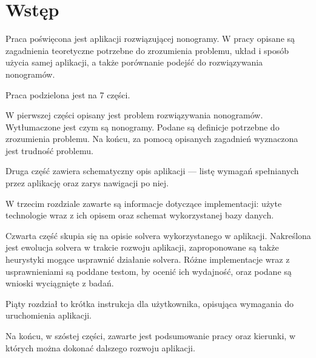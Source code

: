 \chapter*{Wstęp}

\thispagestyle{chapterBeginStyle}



	Praca poświęcona jest aplikacji rozwiązującej nonogramy. W pracy opisane są zagadnienia
teoretyczne potrzebne do zrozumienia problemu, układ i sposób użycia samej aplikacji, a także
porównanie podejść do rozwiązywania nonogramów.

	Praca podzielona jest na 7 części.

	W pierwszej części opisany jest problem rozwiązywania nonogramów. Wytłumaczone jest
czym są nonogramy. Podane są definicje potrzebne do zrozumienia problemu. Na końcu, za pomocą
opisanych zagadnień wyznaczona jest trudność problemu.

	Druga część zawiera schematyczny opis aplikacji — listę wymagań spełnianych przez
aplikację oraz zarys nawigacji po niej.

	W trzecim rozdziale zawarte są informacje dotyczące implementacji: użyte technologie wraz
z ich opisem oraz schemat wykorzystanej bazy danych.

	Czwarta część skupia się na opisie solvera wykorzystanego w aplikacji. Nakreślona jest ewolucja
solvera w trakcie rozwoju aplikacji, zaproponowane są także heurystyki mogące usprawnić działanie
solvera. Różne implementacje wraz z usprawnieniami są poddane testom, by ocenić ich wydajność,
oraz podane są wnioski wyciągnięte z badań.

	Piąty rozdział to krótka instrukcja dla użytkownika, opisująca wymagania do uruchomienia aplikacji.

	Na końcu, w szóstej części, zawarte jest podsumowanie pracy oraz kierunki, w których
można dokonać dalszego rozwoju aplikacji.

